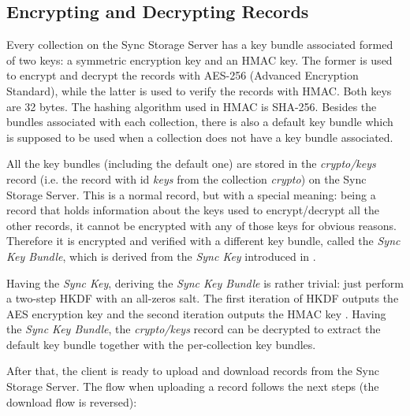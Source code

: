 \subsection{Encrypting and Decrypting Records}
\label{sub-sec:encrypting-and-decrypting-records}

Every collection on the Sync Storage Server has a key bundle associated formed of two keys: a symmetric encryption key and an HMAC key. The former is used to encrypt and decrypt the records with AES-256 (Advanced Encryption Standard), while the latter is used to verify the records with HMAC. Both keys are 32 bytes. The hashing algorithm used in HMAC is SHA-256. Besides the bundles associated with each collection, there is also a default key bundle which is supposed to be used when a collection does not have a key bundle associated.

All the key bundles (including the default one) are stored in the \textit{crypto/keys} record (i.e. the record with id \textit{keys} from the collection \textit{crypto}) on the Sync Storage Server. This is a normal record, but with a special meaning: being a record that holds information about the keys used to encrypt/decrypt all the other records, it cannot be encrypted with any of those keys for obvious reasons. Therefore it is encrypted and verified with a different key bundle, called the \textit{Sync Key Bundle}, which is derived from the \textit{Sync Key} introduced in .

Having the \textit{Sync Key}, deriving the \textit{Sync Key Bundle} is rather trivial: just perform a two-step HKDF with an all-zeros salt. The first iteration of HKDF outputs the AES encryption key and the second iteration outputs the HMAC key \cite{sync-client-docs}. Having the \textit{Sync Key Bundle}, the \textit{crypto/keys} record can be decrypted to extract the default key bundle together with the per-collection key bundles.

After that, the client is ready to upload and download records from the Sync Storage Server. The flow when uploading a record follows the next steps (the download flow is reversed):

